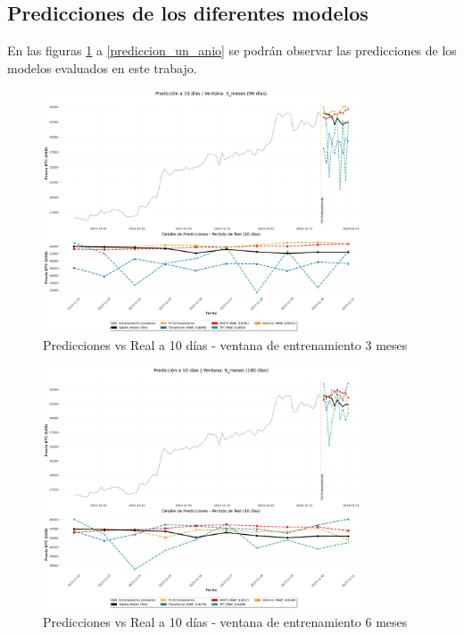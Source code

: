 \documentclass[12pt]{article}
\begin{document}
\subsection{Predicciones de los diferentes modelos}

En las figuras \ref{prediccion_tres_meses} a \ref{prediccion_un_anio} se podrán observar las predicciones de los modelos evaluados en este trabajo.

\begin{figure}[H] 
\centering
\includegraphics[width=0.85\textwidth]{./results/prediccion_bitcoin_3_meses_10dias.png} 
\caption{Predicciones vs Real a 10 días - ventana de entrenamiento 3 meses}
\label{prediccion_tres_meses}
\end{figure}

\begin{figure}[H]
\centering
\includegraphics[width=0.85\textwidth]{./results/prediccion_bitcoin_6_meses_10dias.png} 
\caption{Predicciones vs Real a 10 días - ventana de entrenamiento 6 meses}
\label{prediccion_seis_meses}
\end{figure}
\end{document}

